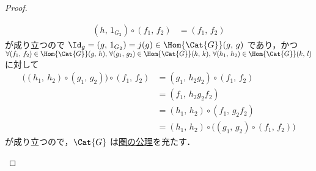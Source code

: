 \documentclass[TQFT_main]{subfiles}
\begin{document}
\begin{proof}
\begin{enumerate}
\begin{align}
            (h,\, 1_{G_2}) \circ (f_1,\, f_2) &= (f_1,\, f_2)
        \end{align}
        が成り立つので $\Id_g = (g,\, 1_{G_2}) = j(g)\in \Hom{\Cat{G}}(g,\, g)$ であり，かつ $\forall (f_1,\, f_2) \in \Hom{\Cat{G}} (g,\, h),\, \forall (g_1,\, g_2) \in \Hom{\Cat{G}} (h,\, k),\, \forall (h_1,\, h_2) \in \Hom{\Cat{G}} (k,\, l)$ に対して
        \begin{align}
            \bigl( (h_1,\ h_2) \circ (g_1,\, g_2) \bigr) \circ (f_1,\, f_2)
            &= (g_1,\, h_2 g_2) \circ (f_1,\, f_2)  \\
            &= (f_1,\, h_2 g_2 f_2) \\
            &= (h_1,\, h_2) \circ (f_1,\, g_2 f_2) \\
            &= (h_1,\, h_2) \circ \bigl( (g_1,\, g_2) \circ (f_1,\, f_2) \bigr) 
        \end{align}
        が成り立つので，$\Cat{G}$ は\hyperref[def:category]{圏の公理}を充たす．
        

\end{enumerate}
\end{proof}
\end{document}
